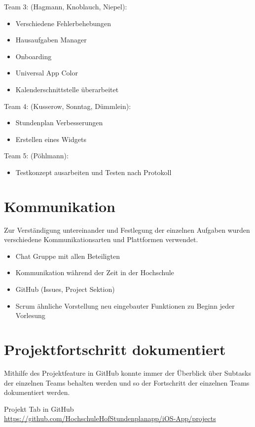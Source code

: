 Team 3: (Hagmann, Knoblauch, Niepel):
\begin{itemize}
\item Verschiedene Fehlerbehebungen
\item Hausaufgaben Manager
\item Onboarding 
\item Universal App Color
\item Kalenderschnittstelle überarbeitet
\end{itemize}


Team 4: (Kusserow, Sonntag, Dümmlein):
\begin{itemize}
\item Stundenplan Verbesserungen
\item Erstellen eines Widgets
\end{itemize}


Team 5: (Pöhlmann):
\begin{itemize}
\item Testkonzept ausarbeiten und Testen nach Protokoll
\end{itemize}


\section{Kommunikation}
Zur Verständigung untereinander und Festlegung der einzelnen Aufgaben wurden verschiedene Kommunikationsarten und Plattformen verwendet.
\begin{itemize}
\item Chat Gruppe mit allen Beteiligten
\item Kommunikation während der Zeit in der Hochschule
\item GitHub (Issues, Project Sektion)
\item Scrum ähnliche Vorstellung neu eingebauter Funktionen zu Beginn jeder Vorlesung
\end{itemize}


\section{Projektfortschritt dokumentiert}
Mithilfe des Projektfeature in GitHub konnte immer der Überblick über Subtasks der einzelnen Teams behalten werden und so der Fortschritt der einzelnen Teams dokumentiert werden.

Projekt Tab in GitHub\\
\url{https://github.com/HochschuleHofStundenplanapp/iOS-App/projects}






